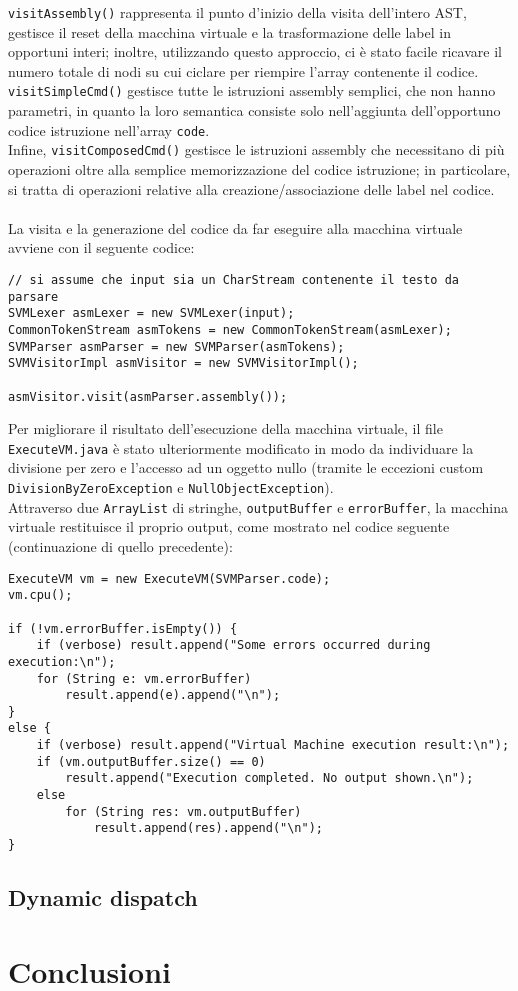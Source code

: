 \documentclass[a4paper]{article}   %
\begin{document}
\lstinline|visitAssembly()| rappresenta il punto d'inizio della visita dell'intero AST, gestisce il reset della macchina virtuale e la trasformazione delle label in opportuni interi; inoltre, utilizzando questo approccio, ci è stato facile ricavare il numero totale di nodi su cui ciclare per riempire l'array contenente il codice.\\
\lstinline|visitSimpleCmd()| gestisce tutte le istruzioni assembly semplici, che non hanno parametri, in quanto la loro semantica consiste solo nell'aggiunta dell'opportuno codice istruzione nell'array \lstinline|code|.\\
Infine, \lstinline|visitComposedCmd()| gestisce le istruzioni assembly che necessitano di più operazioni oltre alla semplice memorizzazione del codice istruzione; in particolare, si tratta di operazioni relative alla creazione/associazione delle label nel codice.\\\\
La visita e la generazione del codice da far eseguire alla macchina virtuale avviene con il seguente codice:
\begin{lstlisting}[basicstyle=\footnotesize\ttfamily]
// si assume che input sia un CharStream contenente il testo da parsare
SVMLexer asmLexer = new SVMLexer(input);
CommonTokenStream asmTokens = new CommonTokenStream(asmLexer);
SVMParser asmParser = new SVMParser(asmTokens);
SVMVisitorImpl asmVisitor = new SVMVisitorImpl();

asmVisitor.visit(asmParser.assembly());
\end{lstlisting}
Per migliorare il risultato dell'esecuzione della macchina virtuale, il file \lstinline|ExecuteVM.java| è stato ulteriormente modificato in modo da individuare la divisione per zero e l'accesso ad un oggetto nullo (tramite le eccezioni custom \lstinline|DivisionByZeroException| e \lstinline|NullObjectException|).\\
Attraverso due \lstinline|ArrayList| di stringhe, \lstinline|outputBuffer| e \lstinline|errorBuffer|, la macchina virtuale restituisce il proprio output, come mostrato nel codice seguente (continuazione di quello precedente):
\begin{lstlisting}[basicstyle=\footnotesize\ttfamily]
ExecuteVM vm = new ExecuteVM(SVMParser.code);
vm.cpu();

if (!vm.errorBuffer.isEmpty()) {
	if (verbose) result.append("Some errors occurred during execution:\n");
	for (String e: vm.errorBuffer)
		result.append(e).append("\n");
}
else {
	if (verbose) result.append("Virtual Machine execution result:\n");
	if (vm.outputBuffer.size() == 0)
		result.append("Execution completed. No output shown.\n");
	else
		for (String res: vm.outputBuffer)
			result.append(res).append("\n");
}
\end{lstlisting}
\subsection{Dynamic dispatch}

\section{Conclusioni}

\end{document}
